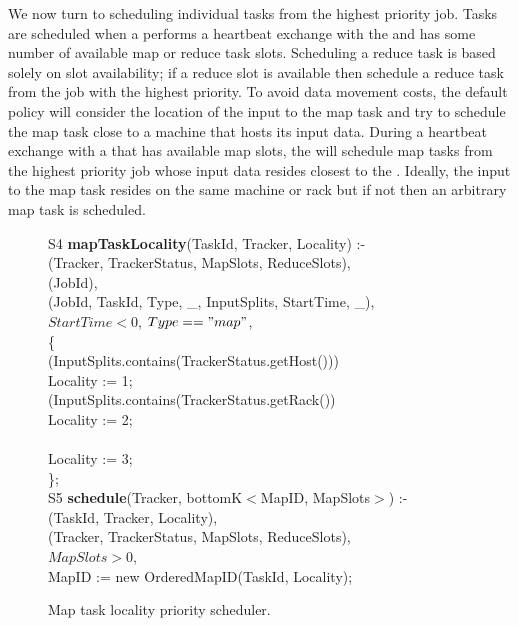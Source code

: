 We now turn to scheduling individual tasks from the highest priority job. Tasks are scheduled when
a \TT performs a heartbeat exchange with the \JT and has some number of available map or reduce 
task slots. Scheduling a reduce task is based solely on slot availability; if a reduce slot is available then
schedule a reduce task from the job with the highest priority. To avoid data movement costs, the default policy
will consider the location of the input to the map task and try to schedule the map task close to a machine 
that hosts its input data. During a heartbeat exchange with a \TT that has available map slots, the \JT will schedule 
map tasks from the highest priority job whose input data resides closest to the \TT. Ideally, the input to the map task resides 
on the same machine or rack but if not then an arbitrary map task is scheduled. 

\begin{figure}
\ssp
\centering
\begin{boxedminipage}{\linewidth}
S4 {\bf mapTaskLocality}(TaskId, Tracker, Locality) :- \\
(Tracker, TrackerStatus, MapSlots, ReduceSlots), \\
(JobId), \\
(JobId, TaskId, Type, \_, InputSplits, StartTime, \_), \\
\datalogspace $StartTime < 0$, $Type == "map"$, \\
\datalogspace \{ \\
\datalogspace {} (InputSplits.contains(TrackerStatus.getHost())) \\
\datalogspace \datalogspace \datalogspace Locality := 1; \\
\datalogspace {} (InputSplits.contains(TrackerStatus.getRack()) \\
\datalogspace \datalogspace \datalogspace Locality := 2; \\
\datalogspace {} \\
\datalogspace \datalogspace \datalogspace Locality := 3; \\
\datalogspace \}; \\
	
S5 {\bf schedule}(Tracker, bottomK$<$MapID, MapSlots$>$) :- \\
(TaskId, Tracker, Locality), \\
(Tracker, TrackerStatus, MapSlots, ReduceSlots), \\
\datalogspace $MapSlots > 0$, \\
\datalogspace MapID := new OrderedMapID(TaskId, Locality); \\

\end{boxedminipage}
\caption{\label{ch:boom:fig:schedule} Map task locality priority scheduler.}
\end{figure}

